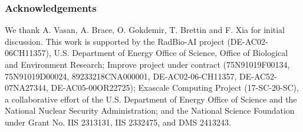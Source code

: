 
\subsubsection*{Acknowledgements}
We thank A. Vasan, A. Brace, O. Gokdemir, T. Brettin and F. Xia for initial discussion. This work is supported  by the RadBio-AI project (DE-AC02-06CH11357), U.S. Department of Energy Office of Science, Office of Biological and Environment Research; Improve project under contract (75N91019F00134, 75N91019D00024, 89233218CNA000001, DE-AC02-06-CH11357, DE-AC52-07NA27344, DE-AC05-00OR22725); Exascale Computing Project (17-SC-20-SC), a collaborative effort of the U.S. Department of Energy Office of Science and the National Nuclear Security Administration; and the National Science Foundation under Grant No. IIS 2313131, IIS 2332475, and DMS 2413243.


